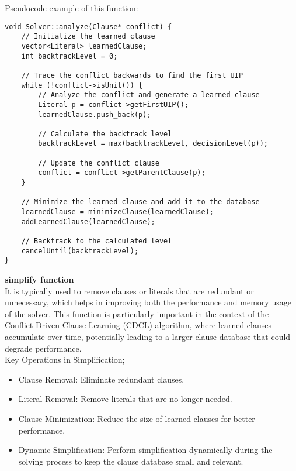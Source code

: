 \documentclass[runningheads]{llncs}
\begin{document}
Pseudocode example of this function:
\begin{verbatim}
void Solver::analyze(Clause* conflict) {
    // Initialize the learned clause
    vector<Literal> learnedClause;
    int backtrackLevel = 0;
    
    // Trace the conflict backwards to find the first UIP
    while (!conflict->isUnit()) {
        // Analyze the conflict and generate a learned clause
        Literal p = conflict->getFirstUIP();
        learnedClause.push_back(p);
        
        // Calculate the backtrack level
        backtrackLevel = max(backtrackLevel, decisionLevel(p));
        
        // Update the conflict clause
        conflict = conflict->getParentClause(p);
    }
    
    // Minimize the learned clause and add it to the database
    learnedClause = minimizeClause(learnedClause);
    addLearnedClause(learnedClause);
    
    // Backtrack to the calculated level
    cancelUntil(backtrackLevel);
}
\end{verbatim}  

\textbf{simplify function}
\\
 It is typically used to remove clauses or literals that are redundant or unnecessary, which helps in improving both the performance and memory usage of the solver. This function is particularly important in the context of the Conflict-Driven Clause Learning (CDCL) algorithm, where learned clauses accumulate over time, potentially leading to a larger clause database that could degrade performance.
 \\
 Key Operations in Simplification;
 \begin{itemize}
     \item Clause Removal: Eliminate redundant clauses.
    \item Literal Removal: Remove literals that are no longer needed.
    \item Clause Minimization: Reduce the size of learned clauses for better performance.
    \item Dynamic Simplification: Perform simplification dynamically during the solving process to keep the clause database small and relevant.
 \end{itemize}
\end{document}

